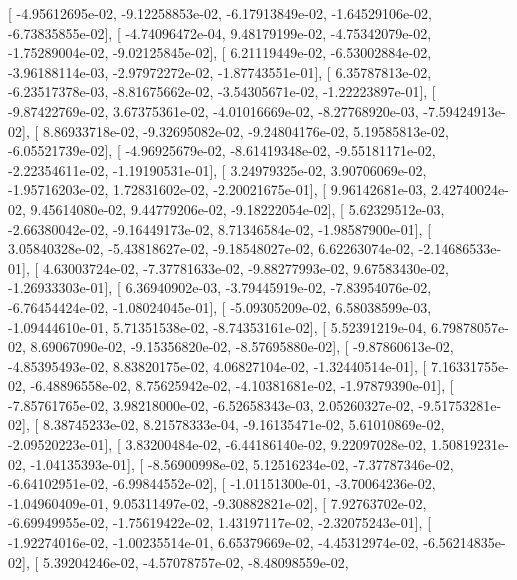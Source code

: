 \documentclass{article}
\begin{document}
       [ -4.95612695e-02,  -9.12258853e-02,  -6.17913849e-02,
         -1.64529106e-02,  -6.73835855e-02],
       [ -4.74096472e-04,   9.48179199e-02,  -4.75342079e-02,
         -1.75289004e-02,  -9.02125845e-02],
       [  6.21119449e-02,  -6.53002884e-02,  -3.96188114e-03,
         -2.97972272e-02,  -1.87743551e-01],
       [  6.35787813e-02,  -6.23517378e-03,  -8.81675662e-02,
         -3.54305671e-02,  -1.22223897e-01],
       [ -9.87422769e-02,   3.67375361e-02,  -4.01016669e-02,
         -8.27768920e-03,  -7.59424913e-02],
       [  8.86933718e-02,  -9.32695082e-02,  -9.24804176e-02,
          5.19585813e-02,  -6.05521739e-02],
       [ -4.96925679e-02,  -8.61419348e-02,  -9.55181171e-02,
         -2.22354611e-02,  -1.19190531e-01],
       [  3.24979325e-02,   3.90706069e-02,  -1.95716203e-02,
          1.72831602e-02,  -2.20021675e-01],
       [  9.96142681e-03,   2.42740024e-02,   9.45614080e-02,
          9.44779206e-02,  -9.18222054e-02],
       [  5.62329512e-03,  -2.66380042e-02,  -9.16449173e-02,
          8.71346584e-02,  -1.98587900e-01],
       [  3.05840328e-02,  -5.43818627e-02,  -9.18548027e-02,
          6.62263074e-02,  -2.14686533e-01],
       [  4.63003724e-02,  -7.37781633e-02,  -9.88277993e-02,
          9.67583430e-02,  -1.26933303e-01],
       [  6.36940902e-03,  -3.79445919e-02,  -7.83954076e-02,
         -6.76454424e-02,  -1.08024045e-01],
       [ -5.09305209e-02,   6.58038599e-03,  -1.09444610e-01,
          5.71351538e-02,  -8.74353161e-02],
       [  5.52391219e-04,   6.79878057e-02,   8.69067090e-02,
         -9.15356820e-02,  -8.57695880e-02],
       [ -9.87860613e-02,  -4.85395493e-02,   8.83820175e-02,
          4.06827104e-02,  -1.32440514e-01],
       [  7.16331755e-02,  -6.48896558e-02,   8.75625942e-02,
         -4.10381681e-02,  -1.97879390e-01],
       [ -7.85761765e-02,   3.98218000e-02,  -6.52658343e-03,
          2.05260327e-02,  -9.51753281e-02],
       [  8.38745233e-02,   8.21578333e-04,  -9.16135471e-02,
          5.61010869e-02,  -2.09520223e-01],
       [  3.83200484e-02,  -6.44186140e-02,   9.22097028e-02,
          1.50819231e-02,  -1.04135393e-01],
       [ -8.56900998e-02,   5.12516234e-02,  -7.37787346e-02,
         -6.64102951e-02,  -6.99844552e-02],
       [ -1.01151300e-01,  -3.70064236e-02,  -1.04960409e-01,
          9.05311497e-02,  -9.30882821e-02],
       [  7.92763702e-02,  -6.69949955e-02,  -1.75619422e-02,
          1.43197117e-02,  -2.32075243e-01],
       [ -1.92274016e-02,  -1.00235514e-01,   6.65379669e-02,
         -4.45312974e-02,  -6.56214835e-02],
       [  5.39204246e-02,  -4.57078757e-02,  -8.48098559e-02,
\end{document}
